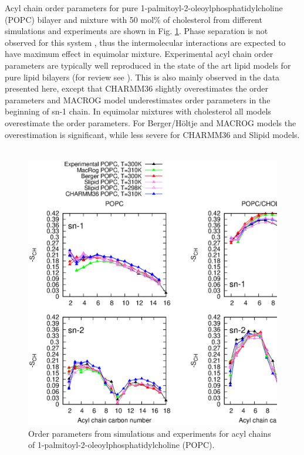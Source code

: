 \documentclass[aps,prl,superscriptaddress,twocolumn]{revtex4}
\begin{document}
Acyl chain order parameters for pure 1-palmitoyl-2-oleoylphosphatidylcholine (POPC) bilayer
and mixture with 50 mol\% of cholesterol from different simulations and experiments
are shown in Fig. \ref{OrderParametersCHOL}. Phase separation is not observed for this system \cite{ionova12,ferreira13},
thus the intermolecular interactions are expected to have maximum effect in equimolar mixture.
Experimental acyl chain order parameters are typically well reproduced in the state of the art lipid models
for pure lipid bilayers (for review see \cite{ollila16}). This is also mainly observed in the data
presented here, except that CHARMM36 slightly overestimates the order parameters and MACROG model
underestimates order parameters in the beginning of sn-1 chain. In equimolar mixtures with cholesterol
all models overestimate the order parameters. For Berger/H\"oltje and MACROG models the overestimation is significant,
while less severe for CHARMM36 and Slipid models.\\
 \\
\begin{figure}[]
  \centering
  \includegraphics[width=17.2cm]{../FIGS/OrderParametersCHOL.eps}
  \caption{\label{OrderParametersCHOL}
    Order parameters from simulations and experiments for acyl chains of  1-palmitoyl-2-oleoylphosphatidylcholine (POPC).
  }
\end{figure}
\end{document}
